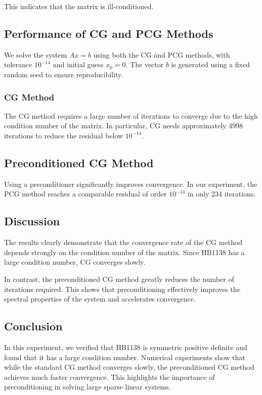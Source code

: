 \documentclass{article}
\begin{document}
This indicates that the matrix is ill-conditioned.

\subsection{Performance of CG and PCG Methods}

We solve the system $Ax = b$ using both the CG and PCG methods,
with tolerance $10^{-14}$ and initial guess $x_0 = 0$.
The vector $b$ is generated using a fixed random seed to ensure reproducibility.

\subsubsection{CG Method}

The CG method requires a large number of iterations to converge due to the high condition number
of the matrix. In particular, CG needs approximately 4998 iterations to reduce the residual
below $10^{-14}$.

\subsection{Preconditioned CG Method}

Using a preconditioner significantly improves convergence.
In our experiment, the PCG method reaches a comparable residual of order $10^{-14}$ in only 234 iterations.

\subsection{Discussion}

The results clearly demonstrate that the convergence rate of the CG method depends
strongly on the condition number of the matrix. Since HB1138 has a large condition number,
CG converges slowly.

In contrast, the preconditioned CG method greatly reduces the number of iterations required.
This shows that preconditioning effectively improves the spectral properties of the
system and accelerates convergence.

\subsection{Conclusion}

In this experiment, we verified that HB1138 is symmetric positive definite and found
that it has a large condition number. Numerical experiments show that while the
standard CG method converges slowly, the preconditioned CG method achieves much faster convergence.
This highlights the importance of preconditioning in solving large sparse linear systems.
\end{document}
